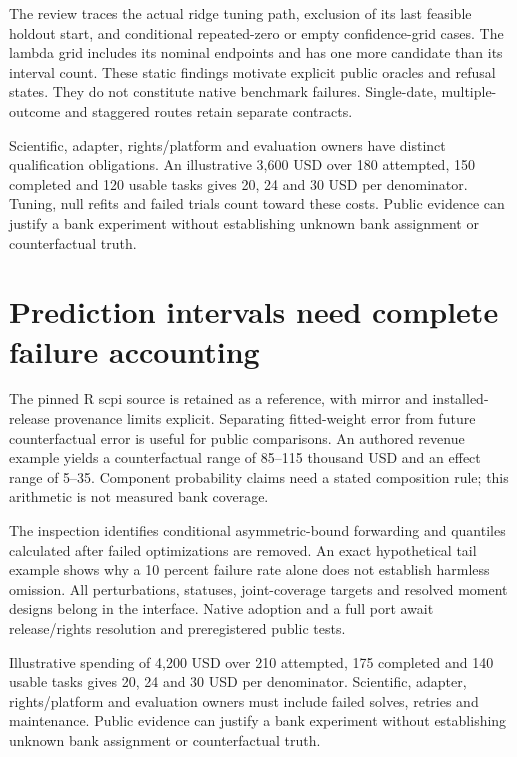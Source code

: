 The review traces the actual ridge tuning path, exclusion of its last
feasible holdout start, and conditional repeated-zero or empty
confidence-grid cases. The lambda grid includes its nominal endpoints
and has one more candidate than its interval count. These static
findings motivate explicit public oracles and refusal states. They do
not constitute native benchmark failures. Single-date, multiple-outcome
and staggered routes retain separate contracts.
\citep{exec24_augsynth_source}

Scientific, adapter, rights/platform and evaluation owners have distinct
qualification obligations. An illustrative 3,600 USD over 180 attempted,
150 completed and 120 usable tasks gives 20, 24 and 30 USD per
denominator. Tuning, null refits and failed trials count toward these
costs. Public evidence can justify a bank experiment without
establishing unknown bank assignment or counterfactual truth.
\citep{exec24_augsynth_choice}

\hypertarget{prediction-intervals-need-complete-failure-accounting}{%
\section{Prediction intervals need complete failure
accounting}\label{prediction-intervals-need-complete-failure-accounting}}

The pinned R scpi source is retained as a reference, with mirror and
installed-release provenance limits explicit. Separating fitted-weight
error from future counterfactual error is useful for public comparisons.
An authored revenue example yields a counterfactual range of 85--115
thousand USD and an effect range of 5--35. Component probability claims
need a stated composition rule; this arithmetic is not measured bank
coverage. \citep{exec24_scpi_source,exec24_scpi_choice}

The inspection identifies conditional asymmetric-bound forwarding and
quantiles calculated after failed optimizations are removed. An exact
hypothetical tail example shows why a 10 percent failure rate alone does
not establish harmless omission. All perturbations, statuses,
joint-coverage targets and resolved moment designs belong in the
interface. Native adoption and a full port await release/rights
resolution and preregistered public tests.
\citep{exec24_scpi_source,exec24_scpi_choice}

Illustrative spending of 4,200 USD over 210 attempted, 175 completed and
140 usable tasks gives 20, 24 and 30 USD per denominator. Scientific,
adapter, rights/platform and evaluation owners must include failed
solves, retries and maintenance. Public evidence can justify a bank
experiment without establishing unknown bank assignment or
counterfactual truth. \citep{exec24_scpi_choice}


